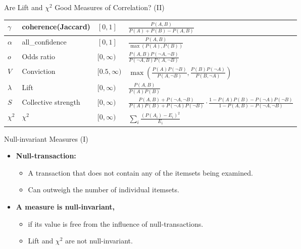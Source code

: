 \begin{frame}{Are Lift and $\chi^2$ Good Measures of Correlation? (II)}
{\begin{tabular}{|m{}<{\centering}|m{}<{\centering}|m{}<{\centering}|m{}<{\centering}|}
			\hline
			$\gamma$        & coherence(Jaccard)  & $[0,1]$        & $\frac{P(A,B)}{P(A)+P(B)-P(A,B)}$                                                                                                           \\
			\hline
			$\alpha$        & all\_confidence     & $[0,1]$        & $\frac{P(A,B)}{\max(P(A),P(B))}$                                                                                                            \\
			\hline
			$o$             & Odds ratio          & $[0,\infty)$   & $\frac{P(A,B)P(\neg A, \neg B)}{P(\neg A,B) P(A,\neg B)}$                                                                                   \\
			\hline
			$V$             & Conviction          & $[0.5,\infty)$ & $\max(\frac{P(A)P(\neg B)}{P(A,\neg B)},\frac{P(B)P(\neg A)}{P(B,\neg A)})$                                                                 \\
			\hline
			$\lambda$       & Lift                & $[0, \infty)$  & $\frac{P(A,B)}{P(A)P(B)}$                                                                                                                   \\
			\hline
			$S$             & Collective strength & $[0,\infty)$   & $\frac{P(A,B) + P(\neg A, \neg B)}{P(A)P(B) + P(\neg A) P(\neg B)} \cdot \frac{1-P(A)P(B)-P(\neg A) P(\neg B)}{1-P(A,B)-P(\neg A, \neg B)}$ \\
			\hline
			$\chi^2$        & $\chi^2$            & $[0,\infty)$   & $\sum_i \frac{(P(A_i)-E_i)^2}{E_i}$                                                                                                         \\
			\hline
		\end{tabular}
	}
\end{frame}

\begin{frame}{Null-invariant Measures (I)}
	\begin{itemize}
		\item \textbf{\color{airforceblue}Null-transaction:}
		      \begin{itemize}
			      \item A transaction that does not contain any of the
			            itemsets being examined.
			      \item Can outweigh the number of individual itemsets.
		      \end{itemize}
		\item \textbf{\color{airforceblue}A measure is null-invariant,}
		      \begin{itemize}
			      \item if its value is free from the influence of
			            null-transactions.
			      \item Lift and $\chi^2$ are not null-invariant.
		      \end{itemize}
	\end{itemize}
\end{frame}

